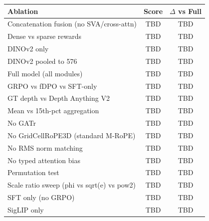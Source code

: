 \begin{tabular}{lcc}
\toprule
Ablation & Score & $\Delta$ vs Full \\
\midrule
Concatenation fusion (no SVA/cross-attn) & TBD & TBD \\
Dense vs sparse rewards & TBD & TBD \\
DINOv2 only & TBD & TBD \\
DINOv2 pooled to 576 & TBD & TBD \\
Full model (all modules) & TBD & TBD \\
GRPO vs fDPO vs SFT-only & TBD & TBD \\
GT depth vs Depth Anything V2 & TBD & TBD \\
Mean vs 15th-pct aggregation & TBD & TBD \\
No GATr & TBD & TBD \\
No GridCellRoPE3D (standard M-RoPE) & TBD & TBD \\
No RMS norm matching & TBD & TBD \\
No typed attention bias & TBD & TBD \\
Permutation test & TBD & TBD \\
Scale ratio sweep (phi vs sqrt(e) vs pow2) & TBD & TBD \\
SFT only (no GRPO) & TBD & TBD \\
SigLIP only & TBD & TBD \\
\bottomrule
\end{tabular}
